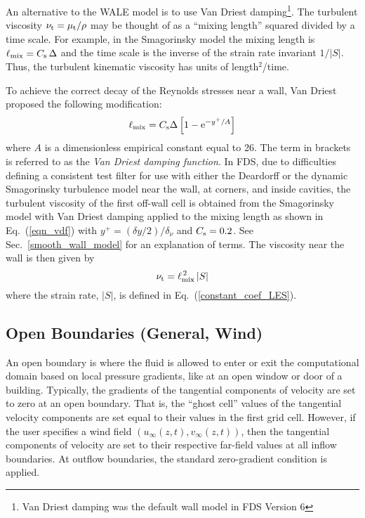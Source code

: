 An alternative to the WALE model is to use Van Driest damping\footnote{Van Driest damping was the default wall model in FDS Version 6}. The turbulent viscosity $\nu_{\rm t} = \mu_{\rm t}/\rho$ may be thought of as a ``mixing length'' squared divided by a time scale.  For example, in the Smagorinsky model the mixing length is $\ell_{\rm mix} = C_{\rm s} \,\Delta$ and the time scale is the inverse of the strain rate invariant $1/|S|$.  Thus, the turbulent kinematic viscosity has units of length$^2$/time.

To achieve the correct decay of the Reynolds stresses near a wall, Van Driest~\cite{Wilcox:1} proposed the following modification:
\begin{equation}
\label{eqn_vdf}
\ell_{\rm mix} = C_{\rm s} \Delta \left[ 1 - \mathrm{e}^{-y^+/A} \right]
\end{equation}
where $A$ is a dimensionless empirical constant equal to 26.  The term in brackets is referred to as the {\em Van Driest damping function}. In FDS, due to difficulties defining a consistent test filter for use with either the Deardorff or the dynamic Smagorinsky turbulence model near the wall, at corners, and inside cavities, the turbulent viscosity of the first off-wall cell is obtained from the Smagorinsky model with Van Driest damping applied to the mixing length as shown in Eq.~(\ref{eqn_vdf}) with $y^+ = (\delta y/2)/\delta_\nu$ and $C_{\rm s} = 0.2$.  See Sec.~\ref{smooth_wall_model} for an explanation of terms. The viscosity near the wall is then given by
\begin{equation}
   \nu_{\rm t} = \ell_{\rm mix}^{\,2}\,|S|  \label{eqn_nearwall_viscosity}
\end{equation}
where the strain rate, $|S|$, is defined in Eq.~(\ref{constant_coef_LES}).

\subsection{Open Boundaries (General, Wind)}
\label{sec:opentang}

An open boundary is where the fluid is allowed to enter or exit the computational domain based on local pressure gradients, like at an open window or door of a building. Typically, the gradients of the tangential components of velocity are set to zero at an open boundary. That is, the ``ghost cell'' values of the tangential velocity components are set equal to their values in the first grid cell. However, if the user specifies a wind field $(u_\infty(z,t),v_\infty(z,t))$, then the tangential components of velocity are set to their respective far-field values at all inflow boundaries. At outflow boundaries, the standard zero-gradient condition is applied.

